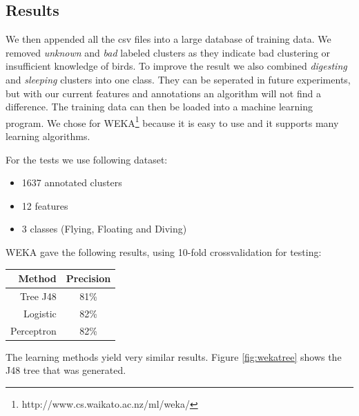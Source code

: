  \subsection{Results}
 We then appended all the csv files into a large database of training data. We removed \emph{unknown} and \emph{bad} labeled clusters as they indicate bad clustering or insufficient knowledge of birds. To improve the result we also combined \emph{digesting} and \emph{sleeping} clusters into one class. They can be seperated in future experiments, but with our current features and annotations an algorithm will not find a difference. The training data can then be loaded into a machine learning program. We chose for WEKA\footnote{http://www.cs.waikato.ac.nz/ml/weka/} because it is easy to use and it supports many learning algorithms.

 For the tests we use following dataset:
\begin{itemize}
\item 1637 annotated clusters
\item 12 features
\item 3 classes (Flying, Floating and Diving)
\end{itemize}


WEKA gave the following results, using 10-fold crossvalidation for testing:

\begin{center}
\begin{tabular}{r|c}
	\textnormal{Method} & \textnormal{Precision} \\ \hline 
	Tree J48 & 81\% \\
	Logistic & 82\% \\
  Perceptron & 82\% \\
\end{tabular}
\end{center}


The learning methods yield very similar results. Figure \ref{fig:wekatree} shows the J48 tree that was generated. 

